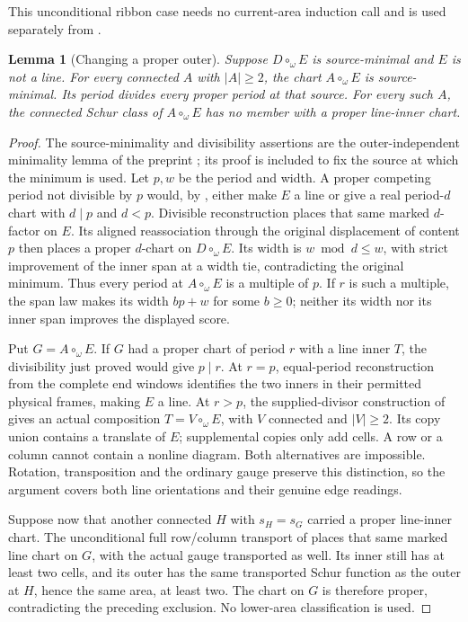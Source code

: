 \documentclass[11pt,a4paper]{amsart}
\numberwithin{equation}{section}
\theoremstyle{plain}
\newtheorem{lemma}[theorem]{Lemma}
\theoremstyle{definition}
\begin{document}
This unconditional ribbon case needs no current-area induction call and is
used separately from .

\begin{lemma}[Changing a proper outer]\label{lem:oim}
Suppose \(D\circ_\omega E\) is source-minimal and \(E\) is not a line.  For every
connected \(A\) with \(|A|\ge2\), the chart \(A\circ_\omega E\) is source-minimal.
Its period divides every proper period at that source.
For every such \(A\), the connected Schur class of \(A\circ_\omega E\)
has no member with a proper line-inner chart.
\end{lemma}
\begin{proof}
The source-minimality and divisibility assertions are the
outer-independent minimality lemma of the preprint
\cite{Shields2026CornerDescent}; its proof is included to fix the source
at which the minimum is used.
Let \(p,w\) be the period and width.  A proper competing period not divisible by
\(p\) would, by , either make \(E\) a line or give a real
period-\(d\) chart with \(d\mid p\) and \(d<p\).  Divisible reconstruction places
that same marked \(d\)-factor on \(E\).  Its aligned reassociation through the
original displacement of content \(p\) then places a proper \(d\)-chart on
\(D\circ_\omega E\).  Its width is \(w\bmod d\le w\), with strict improvement of
the inner span at a width tie, contradicting the original minimum.
Thus every period at \(A\circ_\omega E\) is a multiple of \(p\).  If \(r\) is such
a multiple, the span law makes its width \(bp+w\) for some \(b\ge0\); neither
its width nor its inner span improves the displayed score.

Put \(G=A\circ_\omega E\).  If \(G\) had a proper chart of period \(r\)
with a line inner \(T\), the divisibility just proved would give
\(p\mid r\).  At \(r=p\), equal-period reconstruction from the complete
end windows identifies the two inners in their permitted physical
frames, making \(E\) a line.  At \(r>p\), the supplied-divisor
construction of  gives an actual composition
\(T=V\circ_\omega E\), with \(V\) connected and \(|V|\ge2\).
Its copy union contains a translate of \(E\); supplemental copies only
add cells.  A row or a column cannot contain a nonline diagram.
Both alternatives are impossible.  Rotation, transposition and the
ordinary gauge preserve this distinction, so the argument covers both
line orientations and their genuine edge readings.

Suppose now that another connected \(H\) with \(s_H=s_G\) carried a
proper line-inner chart.  The unconditional full row/column transport
of \cite{Shields2026Gluing} places that same marked line chart on \(G\),
with the actual gauge transported as well.  Its inner still has at
least two cells, and its outer has the same transported Schur function
as the outer at \(H\), hence the same area, at least two.
The chart on \(G\) is therefore proper, contradicting the preceding
exclusion.  No lower-area classification is used.
\end{proof}
\end{document}
